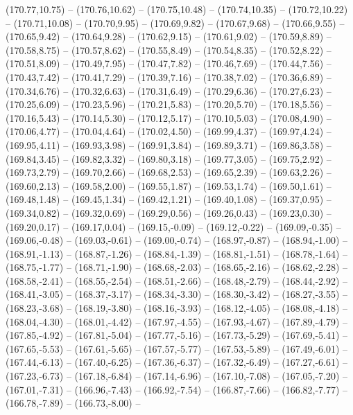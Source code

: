 {  (170.77,10.75) -- (170.76,10.62) -- (170.75,10.48) -- (170.74,10.35) -- (170.72,10.22) -- (170.71,10.08) -- (170.70,9.95) --
  (170.69,9.82) -- (170.67,9.68) -- (170.66,9.55) -- (170.65,9.42) -- (170.64,9.28) -- (170.62,9.15) -- (170.61,9.02) --
  (170.59,8.89) -- (170.58,8.75) -- (170.57,8.62) -- (170.55,8.49) -- (170.54,8.35) -- (170.52,8.22) -- (170.51,8.09) --
  (170.49,7.95) -- (170.47,7.82) -- (170.46,7.69) -- (170.44,7.56) -- (170.43,7.42) -- (170.41,7.29) -- (170.39,7.16) --
  (170.38,7.02) -- (170.36,6.89) -- (170.34,6.76) -- (170.32,6.63) -- (170.31,6.49) -- (170.29,6.36) -- (170.27,6.23) --
  (170.25,6.09) -- (170.23,5.96) -- (170.21,5.83) -- (170.20,5.70) -- (170.18,5.56) -- (170.16,5.43) -- (170.14,5.30) --
  (170.12,5.17) -- (170.10,5.03) -- (170.08,4.90) -- (170.06,4.77) -- (170.04,4.64) -- (170.02,4.50) -- (169.99,4.37) --
  (169.97,4.24) -- (169.95,4.11) -- (169.93,3.98) -- (169.91,3.84) -- (169.89,3.71) -- (169.86,3.58) -- (169.84,3.45) --
  (169.82,3.32) -- (169.80,3.18) -- (169.77,3.05) -- (169.75,2.92) -- (169.73,2.79) -- (169.70,2.66) -- (169.68,2.53) --
  (169.65,2.39) -- (169.63,2.26) -- (169.60,2.13) -- (169.58,2.00) -- (169.55,1.87) -- (169.53,1.74) -- (169.50,1.61) --
  (169.48,1.48) -- (169.45,1.34) -- (169.42,1.21) -- (169.40,1.08) -- (169.37,0.95) -- (169.34,0.82) -- (169.32,0.69) --
  (169.29,0.56) -- (169.26,0.43) -- (169.23,0.30) -- (169.20,0.17) -- (169.17,0.04) -- (169.15,-0.09) -- (169.12,-0.22) --
  (169.09,-0.35) -- (169.06,-0.48) -- (169.03,-0.61) -- (169.00,-0.74) -- (168.97,-0.87) -- (168.94,-1.00) -- (168.91,-1.13) --
  (168.87,-1.26) -- (168.84,-1.39) -- (168.81,-1.51) -- (168.78,-1.64) -- (168.75,-1.77) -- (168.71,-1.90) -- (168.68,-2.03) --
  (168.65,-2.16) -- (168.62,-2.28) -- (168.58,-2.41) -- (168.55,-2.54) -- (168.51,-2.66) -- (168.48,-2.79) -- (168.44,-2.92) --
  (168.41,-3.05) -- (168.37,-3.17) -- (168.34,-3.30) -- (168.30,-3.42) -- (168.27,-3.55) -- (168.23,-3.68) -- (168.19,-3.80) --
  (168.16,-3.93) -- (168.12,-4.05) -- (168.08,-4.18) -- (168.04,-4.30) -- (168.01,-4.42) -- (167.97,-4.55) -- (167.93,-4.67) --
  (167.89,-4.79) -- (167.85,-4.92) -- (167.81,-5.04) -- (167.77,-5.16) -- (167.73,-5.29) -- (167.69,-5.41) -- (167.65,-5.53) --
  (167.61,-5.65) -- (167.57,-5.77) -- (167.53,-5.89) -- (167.49,-6.01) -- (167.44,-6.13) -- (167.40,-6.25) -- (167.36,-6.37) --
  (167.32,-6.49) -- (167.27,-6.61) -- (167.23,-6.73) -- (167.18,-6.84) -- (167.14,-6.96) -- (167.10,-7.08) -- (167.05,-7.20) --
  (167.01,-7.31) -- (166.96,-7.43) -- (166.92,-7.54) -- (166.87,-7.66) -- (166.82,-7.77) -- (166.78,-7.89) -- (166.73,-8.00) --
}
